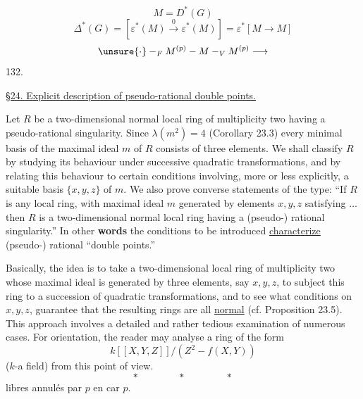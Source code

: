 \deleted{$\unsure{\Delta}$}
\[
M=D^*(G)
\]
\[
\Delta^*(G)=[\varepsilon^*(M)\xrightarrow{0}\varepsilon^*(M)]
=\varepsilon^*[M\longrightarrow M]
\]
\[
\unsure{\cdot}\mathbin{-}_{F}M^{(p)}\mathbin{-}M\mathbin{-}_{V}M^{(p)}\longrightarrow
\]
132.

\uline{\S24. Explicit description of pseudo-rational double points.}

Let $R$ be a two-dimensional normal local ring of multiplicity two having a pseudo-rational singularity. Since $\lambda(m^2)=4$ (Corollary 23.3) every minimal basis of the maximal ideal $m$ of $R$ consists of three elements. We shall classify $R$ by studying its behaviour under successive quadratic transformations, and by relating this behaviour to certain conditions involving, more or less explicitly, a suitable basis $\{x,y,z\}$ of $m$. We also prove converse statements of the type: ``If $R$ is any local ring, with maximal ideal $m$ generated by elements $x,y,z$ satisfying $\ldots$ then $R$ is a two-dimensional normal local ring having a (pseudo-) rational singularity.'' In other \textbf{words} the conditions to be introduced \uline{characterize} (pseudo-) rational ``double points.''

Basically, the idea is to take a two-dimensional local ring of multiplicity two whose maximal ideal is generated by three elements, say $x,y,z$, to subject this ring to a succession of quadratic transformations, and to see what conditions on $x,y,z$, guarantee that the resulting rings are all \uline{normal} (cf. Proposition 23.5). This approach involves a detailed and rather tedious examination of numerous cases. For orientation, the reader may analyse a ring of the form
\[
k[[X,Y,Z]]/(Z^2-f(X,Y))
\]
($k$-a field) from this point of view.
\[
*\qquad\qquad *\qquad\qquad *
\]
   libres annulés par $p$ en car $p$.

